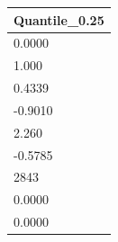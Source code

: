 \begin{tabular}{l}
\toprule
Quantile\_0.25 \\
\midrule
0.0000 \\
1.000 \\
0.4339 \\
-0.9010 \\
2.260 \\
-0.5785 \\
2843 \\
0.0000 \\
0.0000 \\
\bottomrule
\end{tabular}